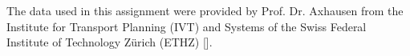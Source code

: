 %
\section*{\ackname}%
%
%

The data used in this assignment were provided by Prof. Dr. Axhausen from the Institute for Transport Planning (IVT) and Systems of the Swiss Federal Institute of Technology Zürich (ETHZ) [\cite{axhausen_observing_2002}].
